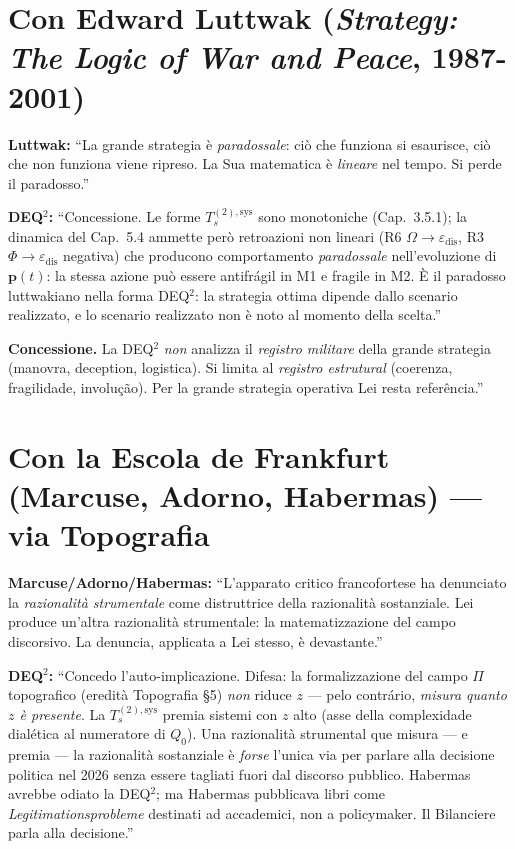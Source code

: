 \section{\texorpdfstring{Con Edward Luttwak (\emph{Strategy: The Logic
of War and Peace},
1987-2001)}{Con Edward Luttwak (Strategy: The Logic of War and Peace, 1987-2001)}}\label{con-edward-luttwak-strategy-the-logic-of-war-and-peace-1987-2001}

\textbf{Luttwak:} ``La grande strategia è \emph{paradossale}: ciò che
funziona si esaurisce, ciò che non funziona viene ripreso. La Sua
matematica è \emph{lineare} nel tempo. Si perde il paradosso.''

\textbf{DEQ$^2$:} ``Concessione. Le forme \(T_s^{(2),\text{sys}}\) sono
monotoniche (Cap.~3.5.1); la dinamica del Cap.~5.4 ammette però
retroazioni non lineari (R6 \(\Omega \to \varepsilon_{\text{dis}}\), R3
\(\Phi \to \varepsilon_{\text{dis}}\) negativa) che producono
comportamento \emph{paradossale} nell'evoluzione di
\(\boldsymbol{p}(t)\): la stessa azione può essere antifrágil in M1 e
fragile in M2. È il paradosso luttwakiano nella forma DEQ$^2$: la strategia
ottima dipende dallo scenario realizzato, e lo scenario realizzato non è
noto al momento della scelta.''

\textbf{Concessione.} La DEQ$^2$ \emph{non} analizza il \emph{registro
militare} della grande strategia (manovra, deception, logistica). Si
limita al \emph{registro estrutural} (coerenza, fragilidade,
involução). Per la grande strategia operativa Lei resta referência.''



\section{Con la Escola de Frankfurt (Marcuse, Adorno, Habermas) ---
via
Topografia}\label{con-la-scuola-di-francoforte-marcuse-adorno-habermas-via-topografia}

\textbf{Marcuse/Adorno/Habermas:} ``L'apparato critico francofortese ha
denunciato la \emph{razionalità strumentale} come distruttrice della
razionalità sostanziale. Lei produce un'altra razionalità strumentale:
la matematizzazione del campo discorsivo. La denuncia, applicata a Lei
stesso, è devastante.''

\textbf{DEQ$^2$:} ``Concedo l'auto-implicazione. Difesa: la formalizzazione
del campo \(\Pi\) topografico (eredità Topografia \S{}5) \emph{non} riduce
\(z\) --- pelo contrário, \emph{misura quanto \(z\) è presente}. La
\(T_s^{(2),\text{sys}}\) premia sistemi con \(z\) alto (asse della
complexidade dialética al numeratore di \(Q_0\)). Una razionalità
strumental que misura --- e premia --- la razionalità sostanziale è
\emph{forse} l'unica via per parlare alla decisione politica nel 2026
senza essere tagliati fuori dal discorso pubblico. Habermas avrebbe
odiato la DEQ$^2$; ma Habermas pubblicava libri come
\emph{Legitimationsprobleme} destinati ad accademici, non a policymaker.
Il Bilanciere parla alla decisione.''

